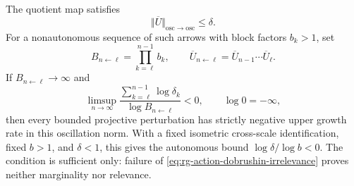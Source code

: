 The quotient map satisfies
\begin{equation}
\Vert\overline U\Vert_{\mathrm{osc}\to\mathrm{osc}}
\leq\delta.
\label{eq:rg-action-dobrushin-contraction}
\end{equation}
For a nonautonomous sequence of such arrows with block factors
\(b_k>1\), set
\begin{equation}
B_{n\leftarrow\ell}=\prod_{k=\ell}^{n-1}b_k,
\qquad
\overline U_{n\leftarrow\ell}
=\overline U_{n-1}\cdots\overline U_\ell.
\label{eq:rg-action-cocycle-scale}
\end{equation}
If \(B_{n\leftarrow\ell}\to\infty\) and
\begin{equation}
\limsup_{n\to\infty}
\frac{\sum_{k=\ell}^{n-1}\log\delta_k}
{\log B_{n\leftarrow\ell}}<0,
\qquad \log0=-\infty,
\label{eq:rg-action-dobrushin-irrelevance}
\end{equation}
then every bounded projective perturbation has strictly negative upper growth
rate in this oscillation norm.  With a fixed isometric cross-scale
identification, fixed \(b>1\), and \(\delta<1\), this gives the autonomous
bound \(\log\delta/\log b<0\).  The condition is sufficient only: failure
of \eqref{eq:rg-action-dobrushin-irrelevance} proves neither marginality nor
relevance. 

